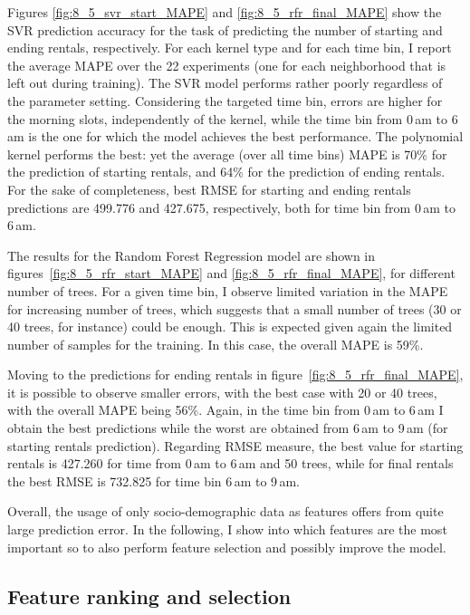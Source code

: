 Figures \ref{fig:8_5_svr_start_MAPE} and \ref{fig:8_5_rfr_final_MAPE} show the SVR prediction accuracy for the task of predicting the number of starting and ending rentals, respectively. For each kernel type and for each time bin, I report the average MAPE over the 22 experiments (one for each neighborhood that is left out during training). The SVR model performs rather poorly regardless of the parameter setting. Considering the targeted time bin, errors are higher for the morning slots, independently of the kernel, while the time bin from 0\,am to 6\,am is the one for which the model achieves the best performance. The polynomial kernel performs the best: yet the average (over all time bins) MAPE is 70\% for the prediction of starting rentals, and 64\% for the prediction of ending rentals. For the sake of completeness, best RMSE for starting and ending rentals predictions are 499.776 and 427.675, respectively, both for time bin from 0\,am to 6\,am.


The results for the Random Forest Regression model are shown in figures~\ref{fig:8_5_rfr_start_MAPE} and  \ref{fig:8_5_rfr_final_MAPE}, for different number of trees. For a given time bin, I observe limited variation in the MAPE for increasing number of trees, which suggests that a small number of trees (30 or 40 trees, for instance) could be enough. This is expected given again the limited number of samples for the training. In this case, the overall MAPE is 59\%.

Moving to the predictions for ending rentals in figure~\ref{fig:8_5_rfr_final_MAPE}, it is possible to observe smaller errors, with the best case with 20 or 40 trees, with the overall MAPE being 56\%. Again, in the time bin from 0\,am to 6\,am I obtain the best predictions while the worst are obtained from 6\,am to 9\,am (for starting rentals prediction).  Regarding RMSE measure, the best value for starting rentals is 427.260 for time from 0\,am to 6\,am and 50 trees, while for final rentals the best RMSE is 732.825 for time bin 6\,am to 9\,am.

Overall, the usage of only socio-demographic data as features offers from quite large prediction error. In the following, I show into which features are the most important so to also perform feature selection and possibly improve the model.

\subsection{Feature ranking and selection}

